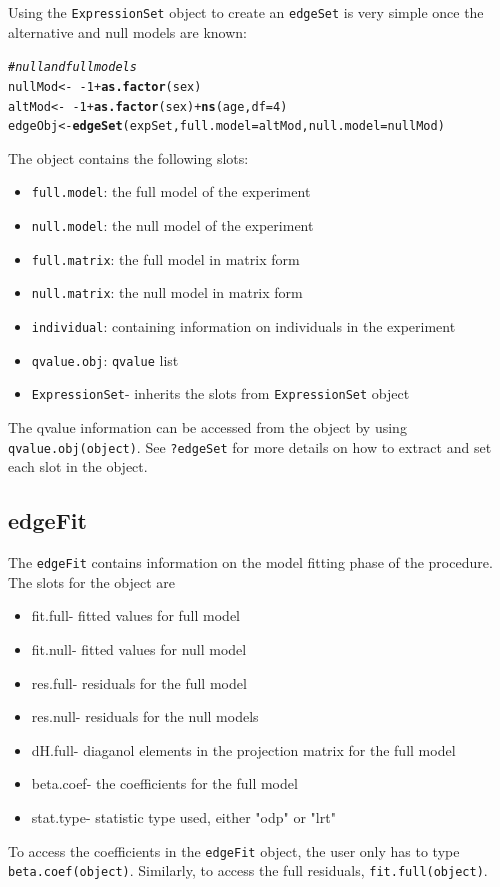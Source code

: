 \documentclass{article}\usepackage[]{graphicx}\usepackage[]{color}
\makeatletter
\newcommand{\hlnum}[1]{\textcolor[rgb]{0.686,0.059,0.569}{#1}}%
\newcommand{\hlcom}[1]{\textcolor[rgb]{0.678,0.584,0.686}{\textit{#1}}}%
\newcommand{\hlopt}[1]{\textcolor[rgb]{0,0,0}{#1}}%
\newcommand{\hlstd}[1]{\textcolor[rgb]{0.345,0.345,0.345}{#1}}%
\newcommand{\hlkwb}[1]{\textcolor[rgb]{0.69,0.353,0.396}{#1}}%
\newcommand{\hlkwc}[1]{\textcolor[rgb]{0.333,0.667,0.333}{#1}}%
\newcommand{\hlkwd}[1]{\textcolor[rgb]{0.737,0.353,0.396}{\textbf{#1}}}%
\newenvironment{kframe}{%
 \def\at@end@of@kframe{}%
 \ifinner\ifhmode%
  \def\at@end@of@kframe{\end{minipage}}%
  \begin{minipage}{\columnwidth}%
 \fi\fi%
 \def\FrameCommand##1{\hskip\@totalleftmargin \hskip-\fboxsep
 \colorbox{shadecolor}{##1}\hskip-\fboxsep
     \hskip-\linewidth \hskip-\@totalleftmargin \hskip\columnwidth}%
 \MakeFramed {\advance\hsize-\width
   \@totalleftmargin\z@ \linewidth\hsize
   \@setminipage}}%
 {\par\unskip\endMakeFramed%
 \at@end@of@kframe}
\newenvironment{knitrout}{}{} %
\makeatother
\begin{document}
Using the {\tt ExpressionSet} object to create an {\tt edgeSet} is very simple once the alternative and null models are known: 
\begin{knitrout}
\color{fgcolor}\begin{kframe}
\begin{alltt}
\hlcom{# null and full models}
\hlstd{nullMod} \hlkwb{<-} \hlopt{~-}\hlnum{1} \hlopt{+} \hlkwd{as.factor}\hlstd{(sex)}
\hlstd{altMod} \hlkwb{<-} \hlopt{~-}\hlnum{1} \hlopt{+} \hlkwd{as.factor}\hlstd{(sex)} \hlopt{+} \hlkwd{ns}\hlstd{(age,} \hlkwc{df} \hlstd{=} \hlnum{4}\hlstd{)}
\hlstd{edgeObj} \hlkwb{<-} \hlkwd{edgeSet}\hlstd{(expSet,} \hlkwc{full.model} \hlstd{= altMod,} \hlkwc{null.model} \hlstd{= nullMod)}
\end{alltt}
\end{kframe}
\end{knitrout}

The object contains the following slots:
\begin{itemize}
\item {\tt full.model}: the full model of the experiment
\item {\tt null.model}: the null model of the experiment
\item {\tt full.matrix}: the full model in matrix form
\item {\tt null.matrix}: the null model in matrix form
\item {\tt individual}: containing information on individuals in the experiment
\item {\tt qvalue.obj}: {\tt qvalue} list
\item {\tt ExpressionSet}- inherits the slots from {\tt ExpressionSet} object
\end{itemize}
The qvalue information can be accessed from the object by using {\tt qvalue.obj(object)}. See {\tt ?edgeSet} for more details on how to extract and set each slot in the object.

\subsection{edgeFit}

The {\tt edgeFit} contains information on the model fitting phase of the procedure. The slots for the object are
\begin{itemize}
\item fit.full- fitted values for full model
\item fit.null- fitted values for null model
\item res.full- residuals for the full model
\item res.null- residuals for the null models
\item dH.full- diaganol elements in the projection matrix for the full model
\item beta.coef- the coefficients for the full model
\item stat.type- statistic type used, either "odp" or "lrt"
\end{itemize}
To access the coefficients in the {\tt edgeFit} object, the user only has to type {\tt beta.coef(object)}. Similarly, to access the full residuals, {\tt fit.full(object)}.
\end{document}
